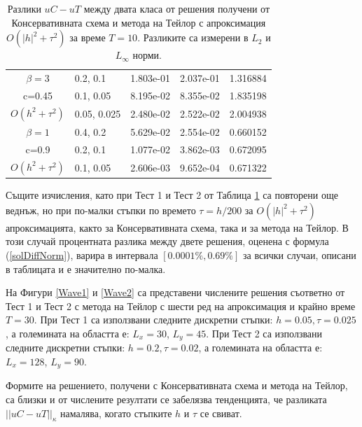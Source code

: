 \documentclass[a4paper]{article}
\newcommand{\rf}[1]{(\ref{#1})}
\theoremstyle{remark}
\begin{document}
\begin{large}
\begin{table}[ht]
\begin{tabular}{||c|l|l|l|l||}
   			\hline 
					\hline 
  $\beta=3$                  &0.2, 0.1         &  1.803e-01       &  2.037e-01& 1.316884     \\
   c=0.45                      &0.1, 0.05       &  8.195e-02       & 8.355e-02 	&  1.835198     \\
     $O(h^2 + \tau^ 2)$ &0.05, 0.025   & 2.480e-02        &2.522e-02  	&   2.004938   \\
			\hline 
			\hline 
       $\beta=1$          &0.4, 0.2        & 5.629e-02      & 2.554e-02 & 0.660152   \\
                  c=0.9      &0.2, 0.1        & 1.077e-02      & 3.862e-03  & 0.672095   \\
  $O(h^2+ \tau^2)$ &0.1, 0.05         & 2.606e-03     & 9.652e-04 & 0.671322   \\
			\hline
	   \hline
			\hline 
		\end{tabular}
		\caption{Разлики $uC - uT$ между двата класа от решения получени от Консервативната схема и метода на Тейлор с апроксимация $O(|h|^2 + \tau^2)$ за време $T=10$. Разликите са измерени в $L_2$ и $L_\infty$ норми.}
\label{tableF}
\end{table}
\FloatBarrier
Същите изчисления, като при Тест 1 и Тест 2 от Таблица \ref{tableF} са повторени още веднъж, но при по-малки стъпки по времето $\tau = h/200$ за $O(|h|^2 +\tau^2)$ апроксимацията, както за Консервативната схема, така и за метода на Тейлор.  В този случай процентната разлика между двете решения, оценена с формула \rf{solDiffNorm}, варира в интервала $[0.0001\%, 0.69\%]$ за всички случаи, описани в таблицата и е значително по-малка. 

На Фигури \ref{Wave1} и \ref{Wave2} са представени числените решения съответно от Тест 1 и Тест 2 с метода на Тейлор с шести ред на апроксимация и крайно време $T=30$. При Тест 1 са използвани следните дискретни стъпки: $h=0.05, \tau = 0.025$, а големината на областта е: $L_x = 30$, $L_y=45$. При Тест 2 са използвани следните дискретни стъпки: $h=0.2, \tau = 0.02$, а големината на областта е: $L_x = 128$, $L_y=90$.

Формите на решението, получени с Консервативната схема и метода на Тейлор, са близки и от числените резултати се забелязва тенденцията, че разликата $||uC - uT||_\kappa$ намалява, когато стъпките $h$ и $\tau$ се свиват.


\end{large}
\end{document}
